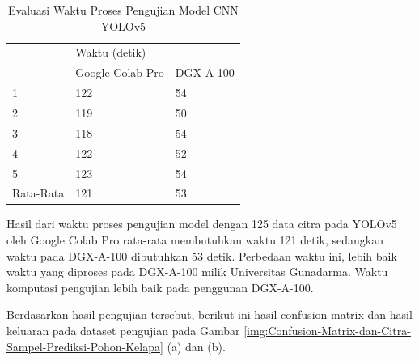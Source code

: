 \begin{singlespace}
	\begin{table}[H]
		\centering
		\caption{Evaluasi Waktu Proses Pengujian Model CNN YOLOv5}
		\label{tbl:Evaluasi-Waktu-Proses-Pengujian-Model-CNN-YOLOv5}
		\begin{tabular}{|l|ll|}
			\hline
			\rowcolor[HTML]{D9D9D9} 
			\cellcolor[HTML]{D9D9D9}                       & \multicolumn{2}{l|}{\cellcolor[HTML]{D9D9D9}Waktu (detik)}                \\ \cline{2-3} 
			\rowcolor[HTML]{D9D9D9} 
			\multirow{-2}{*}{\cellcolor[HTML]{D9D9D9}Fold} & \multicolumn{1}{l|}{\cellcolor[HTML]{D9D9D9}Google Colab Pro} & DGX A 100 \\ \hline
			1                                              & \multicolumn{1}{l|}{122}                                      & 54        \\ \hline
			2                                              & \multicolumn{1}{l|}{119}                                      & 50        \\ \hline
			3                                              & \multicolumn{1}{l|}{118}                                      & 54        \\ \hline
			4                                              & \multicolumn{1}{l|}{122}                                      & 52        \\ \hline
			5                                              & \multicolumn{1}{l|}{123}                                      & 54        \\ \hline
			Rata-Rata                                      & \multicolumn{1}{l|}{121}                                      & 53        \\ \hline
		\end{tabular}
	\end{table}
\end{singlespace}

Hasil dari waktu proses pengujian model dengan 125 data citra pada YOLOv5 oleh Google Colab Pro rata-rata membutuhkan waktu 121 detik, sedangkan waktu pada DGX-A-100 dibutuhkan 53 detik. Perbedaan waktu ini, lebih baik waktu yang diproses pada DGX-A-100 milik Universitas Gunadarma. Waktu komputasi pengujian lebih baik pada penggunan DGX-A-100. 

Berdasarkan hasil pengujian tersebut, berikut ini hasil confusion matrix dan hasil keluaran pada dataset pengujian pada Gambar \ref{img:Confusion-Matrix-dan-Citra-Sampel-Prediksi-Pohon-Kelapa} (a) dan (b).

